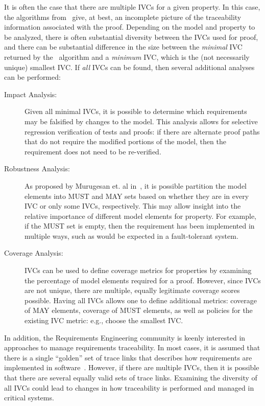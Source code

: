 It is often the case that there are multiple IVCs for a given property.  In this case, the algorithms from~\cite{Ghass16} give, at best, an incomplete picture of the traceability information associated with the proof.  Depending on the model and property to be analyzed, there is often substantial diversity between the IVCs used for proof, and there can be substantial difference in the size between the {\em minimal} IVC returned by the \ucbfalg\ algorithm and a {\em minimum} IVC, which is the (not necessarily unique) smallest IVC.
 If {\em all} IVCs can be found, then several additional analyses can be performed:
\begin{description}
    \item[Impact Analysis:] Given all minimal IVCs, it is possible to determine which requirements may be falsified by changes to the model.  This analysis allows for selective regression verification of tests and proofs: if there are alternate proof paths that do not require the modified portions of the model, then the requirement does not need to be re-verified.
    \item[Robustness Analysis:] As proposed by Murugesan et. al in~\cite{Murugesan16:renext}, it is possible partition the model elements into MUST and MAY sets based on whether they are in every IVC or only some IVCs, respectively.  This may allow insight into the relative importance of different model elements for property.  For example, if the MUST set is empty, then the requirement has been implemented in multiple ways, such as would be expected in a fault-tolerant system.
    \item[Coverage Analysis:] IVCs can be used to define coverage metrics for properties by examining the percentage of model elements required for a proof.  However, since IVCs are not unique, there are multiple, equally legitimate coverage scores possible.  Having all IVCs allows one to define additional metrics: coverage of MAY elements, coverage of MUST elements, as well as policies for the existing IVC metric: e.g., choose the smallest IVC. %
\end{description}

\noindent In addition, the Requirements Engineering community is keenly interested in approaches to manage requirements traceability.  In most cases, it is assumed that there is a single ``golden'' set of trace links that describes how requirements are implemented in software~\cite{COEST,hayes2003improving,cleland2007best}.  However, if there are multiple IVCs, then it is possible that there are several equally valid sets of trace links.  Examining the diversity of all IVCs could lead to changes in how traceability is performed and managed in critical systems.


